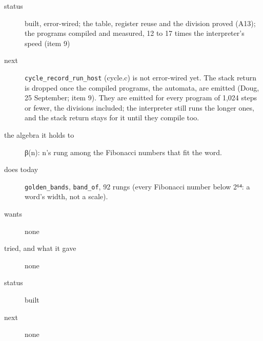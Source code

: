 \begin{description}
\item[{status}] built, error-wired; the table, register reuse and the division proved (A13); the programs compiled and measured, 12 to 17 times the interpreter's speed (item 9)
\item[{next}] \texttt{cycle\_\allowbreak{}record\_\allowbreak{}run\_\allowbreak{}host} (cycle.c) is not error-wired yet. The stack return is dropped once the compiled programs, the automata, are emitted (Doug, 25 September; item 9). They are emitted for every program of 1,024 steps or fewer, the divisions included; the interpreter still runs the longer ones, and the stack return stays for it until they compile too.
\end{description}

\begin{description}
\item[{the algebra it holds to}] β(n): n's rung among the Fibonacci numbers that fit the word.
\item[{does today}] \texttt{golden\_\allowbreak{}bands}, \texttt{band\_\allowbreak{}of}, 92 rungs (every Fibonacci number below 2⁶⁴: a word's width, not a scale).
\item[{wants}] none
\item[{tried, and what it gave}] none
\item[{status}] built
\item[{next}] none
\end{description}

